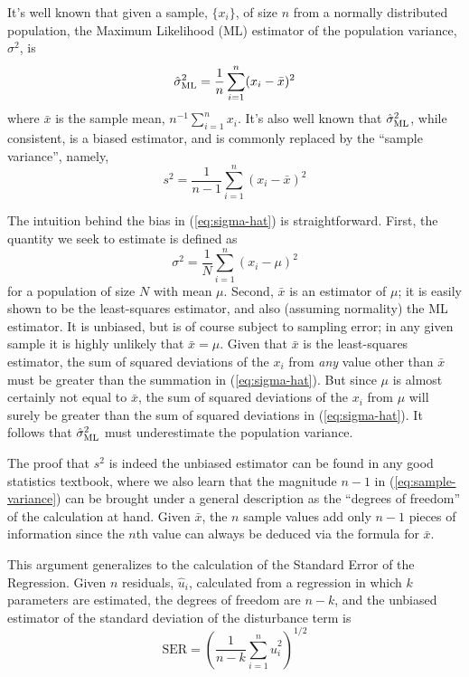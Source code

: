\documentclass{article}
\begin{document}
\newcommand{\subml}{\textrm{\scriptsize ML}}

It's well known that given a sample, $\{x_i\}$, of size $n$ from a
normally distributed population, the Maximum Likelihood (ML) estimator
of the population variance, $\sigma^2$, is
%
\begin{equation}
\label{eq:sigma-hat}
\hat{\sigma}_{\subml}^2 = \frac{1}{n} \sum_{i=1}^n (x_i - \bar{x})^2
\end{equation}
%
where $\bar{x}$ is the sample mean, $n^{-1} \sum_{i=1}^n x_i$.
It's also well known that $\hat{\sigma}_{\subml}^2$, while consistent,
is a biased estimator, and is commonly replaced by the ``sample
variance'', namely,
%
\begin{equation}
\label{eq:sample-variance}
s^2 = \frac{1}{n-1} \sum_{i=1}^n (x_i - \bar{x})^2
\end{equation}

The intuition behind the bias in (\ref{eq:sigma-hat}) is
straightforward.  First, the quantity we seek to estimate is defined
as
%
\[
\sigma^2 = \frac{1}{N} \sum_{i=1}^n (x_i - \mu)^2
\]
%
for a population of size $N$ with mean $\mu$.  Second, $\bar{x}$ is an
estimator of $\mu$; it is easily shown to be the least-squares
estimator, and also (assuming normality) the ML estimator.  It is
unbiased, but is of course subject to sampling error; in any given
sample it is highly unlikely that $\bar{x} = \mu$.  Given that
$\bar{x}$ is the least-squares estimator, the sum of squared
deviations of the $x_i$ from \textit{any} value other than $\bar{x}$
must be greater than the summation in (\ref{eq:sigma-hat}).  But since
$\mu$ is almost certainly not equal to $\bar{x}$, the sum of squared
deviations of the $x_i$ from $\mu$ will surely be greater than the sum
of squared deviations in (\ref{eq:sigma-hat}). It follows that
$\hat{\sigma}_{\subml}^2$ must underestimate the population variance. 

The proof that $s^2$ is indeed the unbiased estimator can be found in
any good statistics textbook, where we also learn that the magnitude
$n-1$ in (\ref{eq:sample-variance}) can be brought under a general
description as the ``degrees of freedom'' of the calculation at
hand. Given $\bar{x}$, the $n$ sample values add only $n-1$ pieces of
information since the $n$th value can always be deduced via the
formula for $\bar{x}$.

This argument generalizes to the calculation of the Standard Error of
the Regression.  Given $n$ residuals, $\hat{u}_i$, calculated from a
regression in which $k$ parameters are estimated, the degrees of
freedom are $n-k$, and the unbiased estimator of the standard
deviation of the disturbance term is
%
\[
\mbox{SER} = \left( \frac{1}{n-k} \sum_{i=1}^n \hat{u}_i^2 \right)^{1/2}
\]
\end{document}
